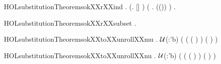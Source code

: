 \newcommand{\HOLsubstitutionTheoremsokXXrXXglXXinsert}{\UseVerbatim{HOLsubstitutionTheoremsokXXrXXglXXinsert}}
\begin{SaveVerbatim}{HOLsubstitutionTheoremsokXXrXXind}
\HOLTokenTurnstile{} \HOLSymConst{\HOLTokenForall{}}.
     (\HOLSymConst{\HOLTokenForall{}}.  [] ) \HOLSymConst{\HOLTokenConj{}} (\HOLSymConst{\HOLTokenForall{}}   .    \HOLSymConst{\HOLTokenImp{}}  ((\HOLSymConst{,})\HOLSymConst{::}) ) \HOLSymConst{\HOLTokenImp{}}
     \HOLSymConst{\HOLTokenForall{}} .   
\end{SaveVerbatim}
\newcommand{\HOLsubstitutionTheoremsokXXrXXind}{\UseVerbatim{HOLsubstitutionTheoremsokXXrXXind}}
\begin{SaveVerbatim}{HOLsubstitutionTheoremsokXXrXXsubset}
\HOLTokenTurnstile{} \HOLSymConst{\HOLTokenForall{}}  .  \HOLConst{\HOLTokenSubset{}}  \HOLSymConst{\HOLTokenImp{}}    \HOLSymConst{\HOLTokenImp{}}   
\end{SaveVerbatim}
\newcommand{\HOLsubstitutionTheoremsokXXrXXsubset}{\UseVerbatim{HOLsubstitutionTheoremsokXXrXXsubset}}
\begin{SaveVerbatim}{HOLsubstitutionTheoremsokXXtoXXunrollXXmu}
\HOLTokenTurnstile{} \HOLSymConst{\HOLTokenForall{}}   .
      \ensuremath{\cal{U}}(:'b) \HOLSymConst{\HOLTokenImp{}}
     (  ( (  )  )  \HOLSymConst{=}
        (  ) )
\end{SaveVerbatim}
\newcommand{\HOLsubstitutionTheoremsokXXtoXXunrollXXmu}{\UseVerbatim{HOLsubstitutionTheoremsokXXtoXXunrollXXmu}}
\begin{SaveVerbatim}{HOLsubstitutionTheoremsokXXtoXXunrollXXnu}
\HOLTokenTurnstile{} \HOLSymConst{\HOLTokenForall{}}   .
      \ensuremath{\cal{U}}(:'b) \HOLSymConst{\HOLTokenImp{}}
     (  ( (  )  )  \HOLSymConst{=}
        (  ) )
\end{SaveVerbatim}
